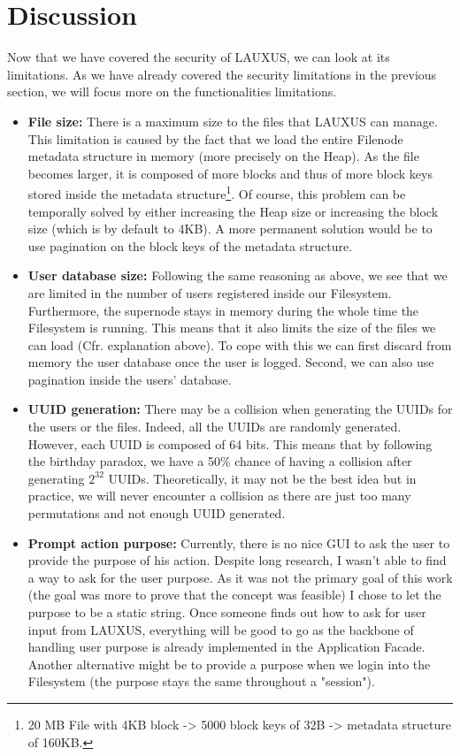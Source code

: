 \documentclass[../main.tex]{subfiles}
\begin{document}
\section{Discussion}
\label{section:analysis:limitations}
\par Now that we have covered the security of LAUXUS, we can look at its limitations. As we have already covered the security limitations in the previous section, we will focus more on the functionalities limitations.
\begin{itemize}
    \item \textbf{File size:} There is a maximum size to the files that LAUXUS can manage. This limitation is caused by the fact that we load the entire Filenode metadata structure in memory (more precisely on the Heap). As the file becomes larger, it is composed of more blocks and thus of more block keys stored inside the metadata structure\footnote{20 MB File with 4KB block -> 5000 block keys of 32B -> metadata structure of 160KB.}. Of course, this problem can be temporally solved by either increasing the Heap size or increasing the block size (which is by default to 4KB). A more permanent solution would be to use pagination on the block keys of the metadata structure.
    \item \textbf{User database size:} Following the same reasoning as above, we see that we are limited in the number of users registered inside our Filesystem. Furthermore, the supernode stays in memory during the whole time the Filesystem is running. This means that it also limits the size of the files we can load (Cfr. explanation above). To cope with this we can first discard from memory the user database once the user is logged. Second, we can also use pagination inside the users' database.
    \item \textbf{UUID generation:} There may be a collision when generating the UUIDs for the users or the files. Indeed, all the UUIDs are randomly generated. However, each UUID is composed of 64 bits. This means that by following the birthday paradox, we have a 50\% chance of having a collision after generating $2^{32}$ UUIDs. Theoretically, it may not be the best idea but in practice, we will never encounter a collision as there are just too many permutations and not enough UUID generated.
    \item \textbf{Prompt action purpose:} Currently, there is no nice GUI to ask the user to provide the purpose of his action. Despite long research, I wasn't able to find a way to ask for the user purpose. As it was not the primary goal of this work (the goal was more to prove that the concept was feasible) I chose to let the purpose to be a static string. Once someone finds out how to ask for user input from LAUXUS, everything will be good to go as the backbone of handling user purpose is already implemented in the Application Facade. Another alternative might be to provide a purpose when we login into the Filesystem (the purpose stays the same throughout a "session").

\end{itemize}
\end{document}
